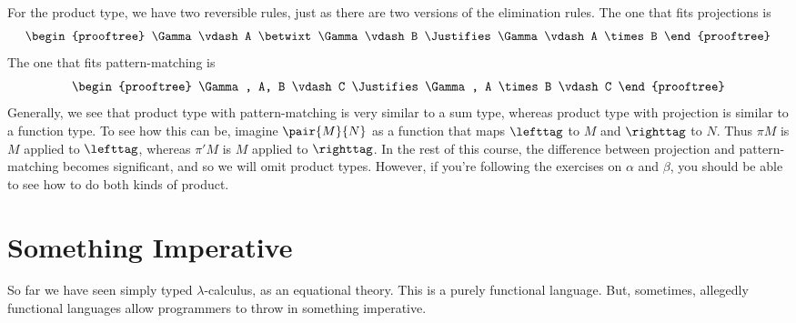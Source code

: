 \documentclass[runningheads,12pt]{llncs}
\begin{document}
For the product type, we have two reversible rules, just as there are two versions of the elimination rules.  The one that fits projections is
\begin{displaymath}
  \begin{prooftree}
    \Gamma \vdash A \betwixt \Gamma \vdash B
    \Justifies
    \Gamma \vdash A \times B
  \end{prooftree}
\end{displaymath}
The one that fits pattern-matching is
\begin{displaymath}
  \begin{prooftree}
    \Gamma, A, B \vdash C
    \Justifies
    \Gamma, A \times B \vdash C
  \end{prooftree}
\end{displaymath}
Generally, we see that product type with pattern-matching is very similar to a sum type, whereas product type with projection is similar to a function type.  To see how this can be, imagine $\pair{M}{N}$ as a function that maps $\lefttag$ to $M$ and $\righttag$ to $N$.  Thus $\pi M$ is $M$ applied to $\lefttag$, whereas $\pi'M$ is $M$ applied to $\righttag$.   In the rest of this course, the difference between projection and pattern-matching becomes significant, and so we will omit product types.  However, if you're following the exercises on $\alpha$ and $\beta$, you should be able to see how to do both kinds of product.

\section{Something Imperative}

So far we have seen simply typed $\lambda$-calculus, as an equational theory.  This is a purely functional language.  But, sometimes, allegedly functional languages allow programmers to throw in something imperative.  
\end{document}
